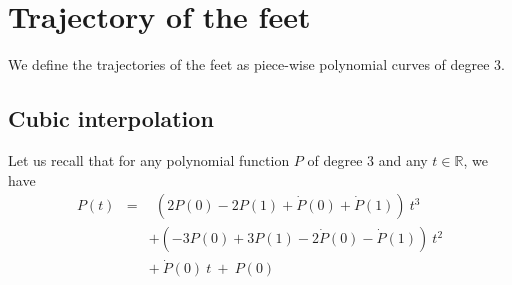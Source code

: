 \documentclass {article}
\newcommand\real{\mathbb{R}}
\begin{document}
\section {Trajectory of the feet}

We define the trajectories of the feet as piece-wise polynomial curves of degree
3.

\subsection {Cubic interpolation}

Let us recall that for any polynomial function $P$ of degree 3 and any $t\in\real$, we have
\begin{eqnarray*}
P (t) &=& \ \ \left(2P(0)-2P(1)+\dot{P}(0)+\dot{P}(1)\right)\ t^3\\
&& +\left(-3P(0)+3P(1)-2\dot{P}(0)-\dot{P}(1)\right)\ t^2\\
&& +\ \dot{P}(0)\ t\ + \ P(0)
\end{eqnarray*}
\end{document}
